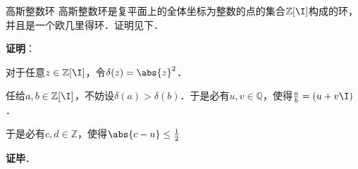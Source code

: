 \begin{example}{高斯整数环}
高斯整数环是复平面上的全体坐标为整数的点的集合$\mathbb{Z}[\I]$构成的环，并且是一个欧几里得环．证明见下．
\end{example}

\textbf{证明}：

对于任意$z\in\mathbb{Z}[\I]$，令$\delta(z)=\abs{z}^2$．

任给$a, b\in\mathbb{Z}[\I]$，不妨设$\delta(a)>\delta(b)$．于是必有$u, v\in\mathbb{Q}$，使得$\frac{a}{b}=(u+v\I)$．

于是必有$c, d\in\mathbb{Z}$，使得$\abs{c-u}\leq\frac{1}{2}$

\textbf{证毕}．

